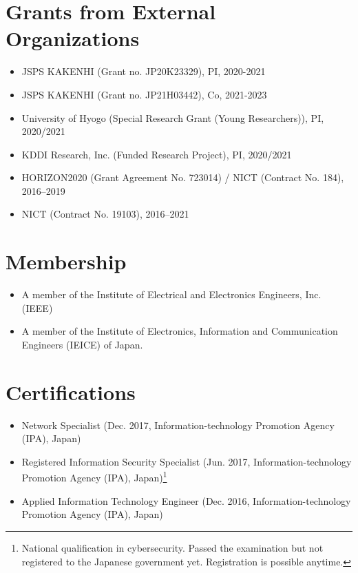 \section*{Grants from External Organizations}
\begin{itemize}
 \item JSPS KAKENHI (Grant no. JP20K23329), PI, 2020-2021
 \item JSPS KAKENHI (Grant no. JP21H03442), Co, 2021-2023
 \item University of Hyogo (Special Research Grant (Young Researchers)), PI, 2020/2021
 \item KDDI Research, Inc. (Funded Research Project), PI, 2020/2021
 \item HORIZON2020 (Grant Agreement No. 723014) / NICT (Contract No. 184), 2016--2019
 \item NICT (Contract No. 19103), 2016--2021
\end{itemize}



\section*{Membership}
\begin{itemize}
\item A member of the Institute of Electrical and Electronics Engineers, Inc. (IEEE)
\item A member of the Institute of Electronics, Information and Communication Engineers
(IEICE) of Japan.
\end{itemize}


\section*{Certifications}
\begin{itemize}
\item Network Specialist (Dec. 2017, Information-technology Promotion Agency (IPA), Japan)
\item Registered Information Security Specialist (Jun. 2017, Information-technology Promotion Agency (IPA), Japan)\footnote{National qualification in cybersecurity. Passed the examination but not registered to the Japanese government yet. Registration is possible anytime.}
\item Applied Information Technology Engineer (Dec. 2016, Information-technology Promotion Agency (IPA), Japan)
\end{itemize}

